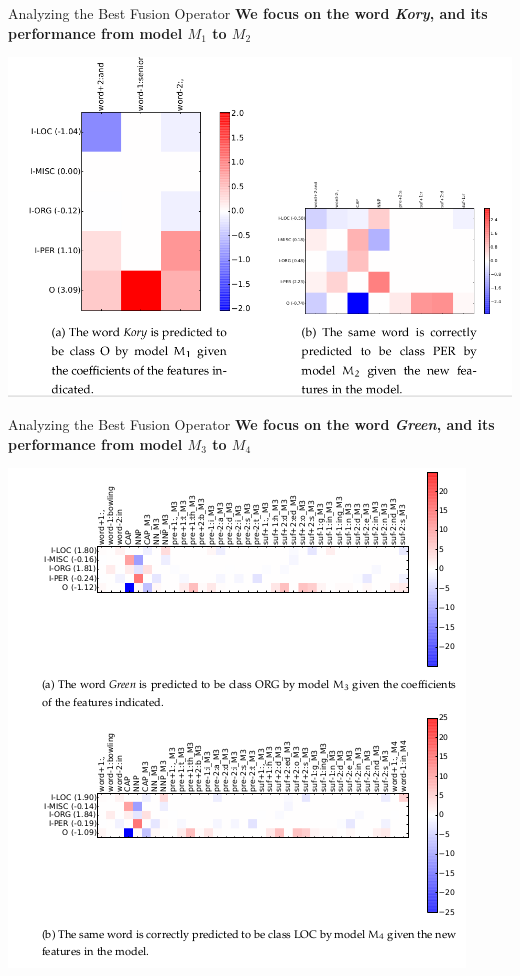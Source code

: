 \documentclass[10pt,xcolor=table]{beamer}
\begin{document}
\begin{frame}{Analyzing the Best Fusion Operator}
\large \textbf{We focus on the word \textit{Kory}, and its performance from model $M_1$ to $M_2$}
\begin{center}
\includegraphics[width=0.6\linewidth]{image2/Chapitre4/fanal1.png}
\end{center}
\end{frame}


\begin{frame}{Analyzing the Best Fusion Operator}
\large \textbf{We focus on the word \textit{Green}, and its performance from model $M_3$ to $M_4$}
\begin{center}
\includegraphics[width=0.6\linewidth]{image2/Chapitre4/fanalm3_m4.png}
\end{center}
\end{frame}
\end{document}
